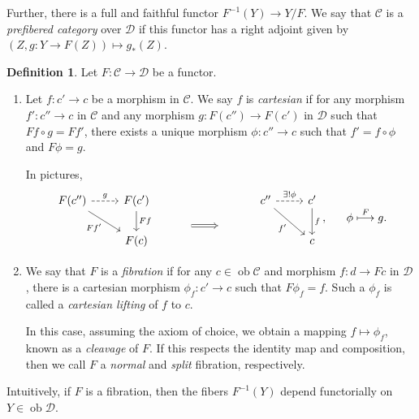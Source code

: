 \documentclass[10pt,letterpaper,cm]{nupset}
\theoremstyle{definition}
\newtheorem{definition}{Definition}[section]
\theoremstyle{theorem}
\theoremstyle{remark}
\newcommand{\1}{\mathbf{1}}
\renewcommand{\c}{\mathscr{C}}
\renewcommand{\d}{\mathscr{D}}
\newcommand{\0}{\vec 0}
\DeclareMathOperator{\ob}{ob}
\begin{document}
Further, there is a full and faithful functor $F^{{-1}}(Y) \to Y/F$. We say that $\c$ is a \textit{prefibered category} over $\d$ if this functor has a right adjoint given by $\left(Z, g: Y \to F(Z)\right) \mapsto g_{\ast}(Z)$.

\bigskip

\begin{definition}  Let $F : \c \to \d$ be a functor.
\begin{enumerate}
\item Let $f: c' \to c$ be a morphism in $\c$. We say $f$ is \textit{cartesian} if for any morphism $f' : c'' \to c$ in $\c$ and any morphism $g : F(c'') \to F(c')$ in $\d$ such that $Ff \circ g = Ff'$, there exists a unique morphism $\phi : c'' \to c$ such that $f' = f \circ \phi$ and $F\phi = g$.

In pictures,
\[
\begin{tikzcd}
F(c'') \arrow[rd, "F{f'}"'] \arrow[r, "g", dashed] & F(c') \arrow[d, "F{f}"] & {} \arrow[r, Rightarrow, shift right=9] & {} & c'' \arrow[r, "\exists!{\phi}", dashed] \arrow[rd, "f'"'] & c' \arrow[d, "f"] \\
                                              & F(c)                    &                                         &    &                                                     & c                
\end{tikzcd}, \ \ \quad \phi \overset{F}{\longmapsto} g
.\]
\item We say that $F$ is a \textit{fibration} if for any $c \in \ob{\c}$ and morphism $f: d \to Fc$ in $\d$, there is a cartesian morphism $\phi_f : c' \to c$ such that $F{\phi_f} =f$. Such a $\phi_f$ is called a \textit{cartesian lifting} of $f$ to $c$.

In this case, assuming the axiom of choice, we obtain a mapping $f \mapsto \phi_f$, known as a \textit{cleavage} of $F$. If this respects the identity map and composition, then we call $F$ a \textit{normal} and \textit{split} fibration, respectively. 
\end{enumerate}
\end{definition}

Intuitively, if $F$ is a fibration, then the fibers $F^{-1}(Y)$ depend functorially on $Y\in \ob{\d}$. 
\end{document}
